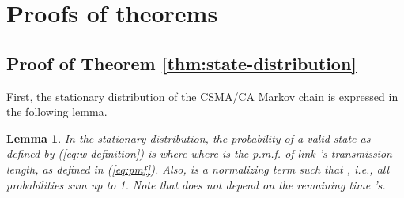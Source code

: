 \documentclass{IEEEtran}
\newtheorem{lemma}{Lemma}
\begin{document}
\appendix

\section{\label{sec:Proofs-of-theorems}Proofs of theorems}


\subsection{\label{sub:Proof-product-form}Proof of Theorem \ref{thm:state-distribution}}

First, the stationary distribution of the CSMA/CA Markov chain is
expressed in the following lemma. 
\begin{lemma}
\label{thm:extended-state-distribution}In the stationary distribution,
the probability of a valid state  as defined by (\ref{eq:w-definition})
is
where 
where  is the p.m.f. of link 's transmission length,
as defined in (\ref{eq:pmf}). Also,  is a normalizing term such
that , i.e., all probabilities sum up to 1. Note
that  does not depend on the remaining time 's.\end{lemma}
\end{document}
